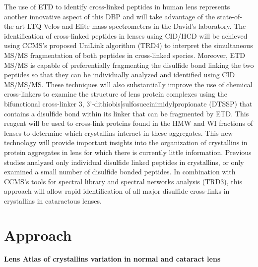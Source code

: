 \documentclass[arial,11pt]{article}
\begin{document}
The use of ETD to identify cross-linked peptides in human lens represents another innovative aspect of this DBP and will take advantage of the state-of-the-art LTQ Velos and Elite mass spectrometers in the David's laboratory. The identification of cross-linked peptides in lenses using CID/HCD will be achieved using CCMS's proposed UniLink algorithm (TRD4) to interpret the simultaneous MS/MS fragmentation of both peptides in cross-linked species. %
Moreover, ETD MS/MS is capable of preferentially fragmenting the disulfide bond linking the two peptides so that they can be individually analyzed and identified using CID MS/MS/MS. These techniques will also substantially improve the use of chemical cross-linkers to examine the structure of lens protein complexes using the bifunctional cross-linker 3, 3'-dithiobis[sulfosuccinimidylpropionate (DTSSP) that contains a disulfide bond within its linker that can be fragmented by ETD.  This reagent will be used to cross-link proteins found in the HMW and WI fractions of lenses to determine which crystallins interact in these aggregates. This new technology will provide important insights into the organization of crystallins in protein aggregates in lens for which there is currently little information. Previous studies analyzed only individual disulfide linked peptides in crystallins, or only examined a small number of disulfide bonded peptides. In combination with CCMS's tools for spectral library and spectral networks analysis (TRD3), this approach will allow rapid identification of all major disulfide cross-links in crystallins in cataractous lenses.

\section{Approach}


\paragraph{Lens Atlas of crystallins variation in normal and cataract lens}
\end{document}
